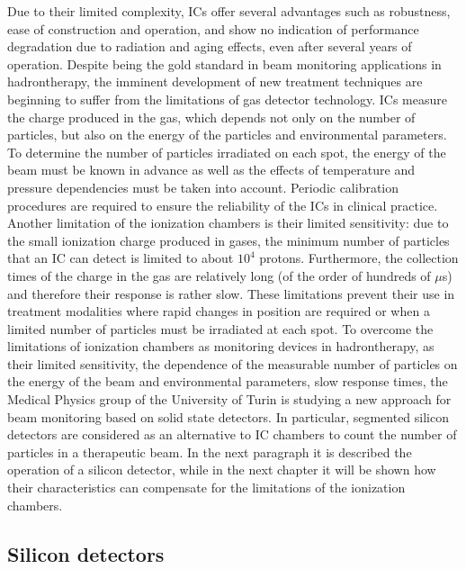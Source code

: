 \noindent Due to their limited complexity, ICs offer several advantages such as robustness, ease of construction and operation, and show no indication of performance degradation due to radiation and aging effects, even after several years of operation.
Despite being the gold standard in beam monitoring applications in hadrontherapy, the imminent development of new treatment techniques are beginning to suffer from the limitations of gas detector technology.
\newline
ICs measure the charge produced in the gas, which depends not only on the number of particles, but also on the energy of the particles and environmental parameters.
To determine the number of particles irradiated on each spot, the energy of the beam must be known in advance as well as the effects of temperature and pressure dependencies must be taken into account.
Periodic calibration procedures are required to ensure the reliability of the ICs in clinical practice.
Another limitation of the ionization chambers is their limited sensitivity: due to the small ionization charge produced in gases, the minimum number of particles that an IC can detect is limited to about $10^4$ protons.
Furthermore, the collection times of the charge in the gas are relatively long (of the order of hundreds of $\mu$s) and therefore their response is rather slow.
These limitations prevent their use in treatment modalities where rapid changes in position are required or when a limited number of particles must be irradiated at each spot.
\newline
To overcome the limitations of ionization chambers as monitoring devices in hadrontherapy, as their limited sensitivity, the dependence of the measurable number of particles on the energy of the beam and environmental parameters, slow response times, the Medical Physics group of the University of Turin is studying a new approach for beam monitoring based on solid state detectors.
In particular, segmented silicon detectors are considered as an alternative to IC chambers to count the number of particles in a therapeutic beam.
\newline
In the next paragraph it is described the operation of a silicon detector, while in the next chapter it will be shown how their characteristics can compensate for the limitations of the ionization chambers.



\subsection{Silicon detectors}

